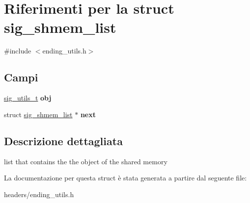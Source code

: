 \hypertarget{structsig__shmem__list}{}\section{Riferimenti per la struct sig\+\_\+shmem\+\_\+list}
\label{structsig__shmem__list}


{\ttfamily \#include $<$ending\+\_\+utils.\+h$>$}

\subsection*{Campi}
\begin{DoxyCompactItemize}
\item 
\mbox{\label{structsig__shmem__list_a988745914fe696370eea22407860cbe1}} 
\hyperlink{structsig__utils__t}{sig\+\_\+utils\+\_\+t} {\bfseries obj}
\item 
\mbox{\label{structsig__shmem__list_a8936a03d40f822a08973610b80304264}} 
struct \hyperlink{structsig__shmem__list}{sig\+\_\+shmem\+\_\+list} $\ast$ {\bfseries next}
\end{DoxyCompactItemize}


\subsection{Descrizione dettagliata}
list that contains the the object of the shared memory 

La documentazione per questa struct è stata generata a partire dal seguente file\+:\begin{DoxyCompactItemize}
\item 
headers/ending\+\_\+utils.\+h\end{DoxyCompactItemize}

